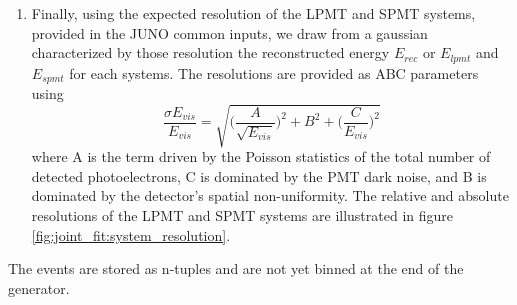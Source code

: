 \documentclass[../main.tex]{subfiles}
\begin{document}
\begin{enumerate}
  \item Finally, using the expected resolution of the LPMT and SPMT systems,  provided in the JUNO common inputs, we draw from a gaussian characterized by those resolution the reconstructed energy $E_{rec}$ or $E_{lpmt}$ and $E_{spmt}$ for each systems. The resolutions are provided as ABC parameters using
    \begin{equation}
      \label{eq:joint_fit:abc}
      \frac{\sigma E_{vis}}{E_{vis}} = \sqrt{\bigg(\frac{A}{\sqrt{E_{vis}}}\bigg)^2 + B^2 + \bigg(\frac{C}{E_{vis}}\bigg)^2}
    \end{equation}
    where A is the term driven by the Poisson statistics of the total number of detected photoelectrons, C is dominated by the PMT dark noise, and B is dominated by the detector’s spatial non-uniformity. The relative and absolute resolutions of the LPMT and SPMT systems are illustrated in figure \ref{fig:joint_fit:system_resolution}.
\end{enumerate}

The events are stored as n-tuples and are not yet binned at the end of the generator.
\end{document}
